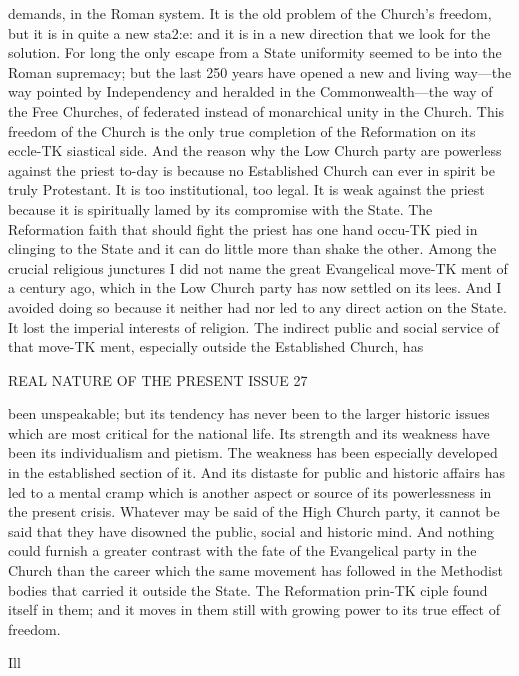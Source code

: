 \documentclass[12pt,a5paper,oneside]{book}
\begin{document}
demands, in the Roman system. It is the old problem 
of the Church's freedom, but it is in quite a new 
sta2:e: and it is in a new direction that we look for 
the solution. For long the only escape from a State 
uniformity seemed to be into the Roman supremacy; 
but the last 250 years have opened a new and 
living way---the way pointed by Independency and 
heralded in the Commonwealth---the way of the Free 
Churches, of federated instead of monarchical unity in 
the Church. This freedom of the Church is the 
only true completion of the Reformation on its eccle-TK
siastical side. And the reason why the Low Church 
party are powerless against the priest to-day is because 
no Established Church can ever in spirit be truly 
Protestant. It is too institutional, too legal. It is 
weak against the priest because it is spiritually lamed 
by its compromise with the State. The Reformation 
faith that should fight the priest has one hand occu-TK
pied in clinging to the State and it can do little more 
than shake the other. Among the crucial religious 
junctures I did not name the great Evangelical move-TK
ment of a century ago, which in the Low Church 
party has now settled on its lees. And I avoided doing 
so because it neither had nor led to any direct action 
on the State. It lost the imperial interests of religion. 
The indirect public and social service of that move-TK
ment, especially outside the Established Church, has 



REAL NATURE OF THE PRESENT ISSUE 27 

been unspeakable; but its tendency has never been to 
the larger historic issues which are most critical for 
the national life. Its strength and its weakness have 
been its individualism and pietism. The weakness has 
been especially developed in the established section of 
it. And its distaste for public and historic affairs has 
led to a mental cramp which is another aspect or 
source of its powerlessness in the present crisis. 
Whatever may be said of the High Church party, it 
cannot be said that they have disowned the public, 
social and historic mind. And nothing could furnish 
a greater contrast with the fate of the Evangelical 
party in the Church than the career which the same 
movement has followed in the Methodist bodies that 
carried it outside the State. The Reformation prin-TK
ciple found itself in them; and it moves in them still 
with growing power to its true effect of freedom. 



Ill 
\end{document}
